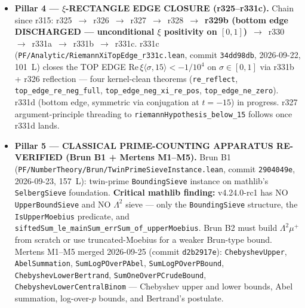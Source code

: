 \begin{itemize}
\item \textbf{Pillar 4 --- $\xi$-RECTANGLE EDGE CLOSURE
(r325--r331c).} Chain since r315: r325~$\to$~r326~$\to$~r327~$\to$~r328~$\to$~\textbf{r329b
(bottom edge DISCHARGED --- unconditional $\xi$ positivity on
$[0,1]$)}~$\to$~r330~$\to$~r331a~$\to$~r331b~$\to$~r331c. r331c
(\texttt{PF/Analytic/RiemannXiTopEdge\_r331c.lean}, commit
\texttt{34dd98db}, 2026-09-22, 101~L) closes the TOP EDGE
$\text{Re}\,\xi\langle\sigma,15\rangle < -1/10^4$ on
$\sigma \in [0,1]$ via r331b + r326 reflection --- four kernel-clean
theorems (\texttt{re\_reflect}, \texttt{top\_edge\_re\_neg\_full},
\texttt{top\_edge\_neg\_xi\_re\_pos}, \texttt{top\_edge\_ne\_zero}).
r331d (bottom edge, symmetric via conjugation at $t = -15$)
in progress. r327 argument-principle threading to
\texttt{riemannHypothesis\_below\_15} follows once r331d lands.

\item \textbf{Pillar 5 --- CLASSICAL PRIME-COUNTING APPARATUS
RE-VERIFIED (Brun B1 + Mertens M1--M5).} Brun B1
(\texttt{PF/NumberTheory/Brun/TwinPrimeSieveInstance.lean},
commit \texttt{2904049e}, 2026-09-23, 157~L): twin-prime
\texttt{BoundingSieve} instance on mathlib's \texttt{SelbergSieve}
foundation. \textbf{Critical mathlib finding:} v4.24.0-rc1 has NO
\texttt{UpperBoundSieve} and NO $\Lambda^2$ sieve --- only the
\texttt{BoundingSieve} structure, the \texttt{IsUpperMoebius}
predicate, and \texttt{siftedSum\_le\_mainSum\_errSum\_of\_upperMoebius}.
Brun B2 must build $\Lambda^2 \mu^+$ from scratch or use
truncated-Moebius for a weaker Brun-type bound.
Mertens M1--M5 merged 2026-09-25 (commit \texttt{d2b2917e}):
\texttt{ChebyshevUpper}, \texttt{AbelSummation},
\texttt{SumLogPOverPAbel}, \texttt{SumLogPOverPBound},
\texttt{ChebyshevLowerBertrand}, \texttt{SumOneOverPCrudeBound},
\texttt{ChebyshevLowerCentralBinom} --- Chebyshev upper and lower
bounds, Abel summation, log-over-$p$ bounds, and Bertrand's postulate.


\end{itemize}
